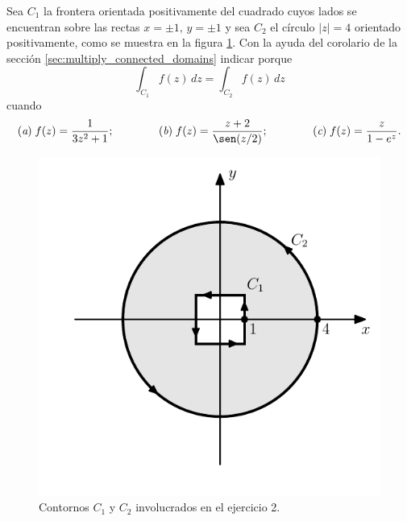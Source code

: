 \documentclass[a4paper]{report}
\begin{document}
Sea \(C_1\) la frontera orientada positivamente del cuadrado cuyos lados se encuentran sobre las rectas \(x=\pm1,\,y=\pm1\) y sea \(C_2\) el círculo \(|z|=4\) orientado positivamente, como se muestra en la figura \ref{fig:exercise_53_02}. Con la ayuda del corolario de la sección \ref{sec:multiply_connected_domains} indicar porque
\[
 \int_{C_1}f(z)\,dz=\int_{C_2}f(z)\,dz
\]
cuando
\[
 (\textit{a})\;f(z)=\frac{1}{3z^2+1};\qquad\qquad (\textit{b})\;f(z)=\frac{z+2}{\sen(z/2)};\qquad\qquad (\textit{c})\;f(z)=\frac{z}{1-e^z}.
\]
\begin{figure}[!htb]
  \begin{minipage}[c]{0.48\textwidth}
    \includegraphics[width=\textwidth]{figuras/exercise_53_02.pdf}
  \end{minipage}\hfill
  \begin{minipage}[c]{0.42\textwidth}
    \caption{
       Contornos \(C_1\) y \(C_2\) involucrados en el ejercicio 2.
    }\label{fig:exercise_53_02}
  \end{minipage}
\end{figure}
\end{document}

